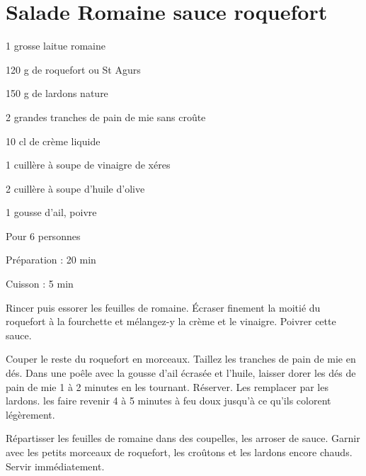 \section{Salade Romaine sauce roquefort}

\begin{ingredients}
\item 1 grosse laitue romaine
\item 120 g de roquefort ou St Agurs
\item 150 g de lardons nature
\item 2 grandes tranches de pain de mie sans croûte
\item 10 cl de crème liquide
\item 1 cuillère à soupe de vinaigre de xéres
\item 2 cuillère à soupe d'huile d'olive
\item 1 gousse d'ail, poivre
\end{ingredients}
\begin{infos}
\item Pour 6 personnes		%
\item Préparation : 20 min		%
\item Cuisson : 5 min			%
\end{infos}
\begin{etapes}
\item Rincer puis essorer les feuilles de romaine. Écraser finement la moitié du roquefort à la fourchette et mélangez-y la crème et le vinaigre. Poivrer cette sauce.
\item Couper le reste du roquefort en morceaux. Taillez les tranches de pain de mie en dés. Dans une poêle avec la gousse d'ail écrasée et l'huile, laisser dorer les dés de pain de mie 1 à 2 minutes en les tournant. Réserver. Les remplacer par les lardons. les faire revenir 4 à 5 minutes à feu doux jusqu'à ce qu'ils colorent légèrement.
\item Répartisser les feuilles de romaine dans des coupelles, les arroser de sauce. Garnir avec les petits morceaux de roquefort, les croûtons et les lardons encore chauds. Servir immédiatement.
\end{etapes}
\begin{conseils}
\end{conseils}
